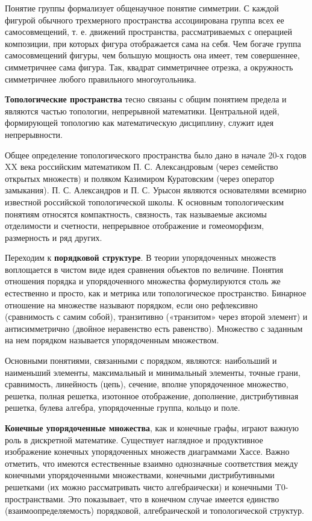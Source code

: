 Понятие группы формализует общенаучное понятие симметрии. С каждой фигурой обычного трехмерного пространства ассоциирована группа всех ее самосовмещений, т. е. движений пространства, рассматриваемых с операцией композиции, при которых фигура отображается сама на себя. Чем богаче группа самосовмещений фигуры, чем большую мощность она имеет, тем совершеннее, симметричнее сама фигура. Так, квадрат симметричнее отрезка, а окружность симметричнее любого правильного многоугольника. 

\textbf{Топологические пространства} тесно связаны с общим понятием предела и являются частью топологии, непрерывной математики. Центральной идей, формирующей топологию как математическую дисциплину, служит идея непрерывности.

Общее определение топологического пространства было дано в начале 20-х годов XX века российским математиком П. С. Александровым (через семейство открытых множеств) и поляком Казимиром Куратовским (через оператор замыкания). П. С. Александров и П. С. Урысон являются основателями всемирно известной российской топологической школы. К основным топологическим понятиям относятся компактность, связность, так называемые аксиомы отделимости и счетности, непрерывное отображение и гомеоморфизм, размерность и ряд других.

Переходим к \textbf{порядковой структуре}. В теории упорядоченных множеств воплощается в чистом виде идея сравнения объектов по величине. Понятия отношения порядка и упорядоченного множества формулируются столь же естественно и просто, как и метрика или топологическое пространство. Бинарное отношение на множестве называют порядком, если оно рефлексивно (сравнимость с самим собой), транзитивно («транзитом» через второй элемент) и антисимметрично (двойное неравенство есть равенство). Множество с заданным на нем порядком называется упорядоченным множеством.

Основными понятиями, связанными с порядком, являются: наибольший и наименьший элементы, максимальный и минимальный элементы, точные грани, сравнимость, линейность (цепь), сечение, вполне упорядоченное множество, решетка, полная решетка, изотонное отображение, дополнение, дистрибутивная решетка, булева алгебра, упорядоченные группа, кольцо и поле.

\textbf{Конечные упорядоченные множества}, как и конечные графы, играют важную роль в дискретной математике. Существует наглядное и продуктивное изображение конечных упорядоченных множеств диаграммами Хассе. Важно отметить, что имеются естественные взаимно однозначные соответствия между конечными упорядоченными множествами, конечными дистрибутивными решетками (их можно рассматривать чисто алгебраически) и конечными T0-пространствами. Это показывает, что в конечном случае имеется единство (взаимоопределяемость) порядковой, алгебраической и топологической структур.

